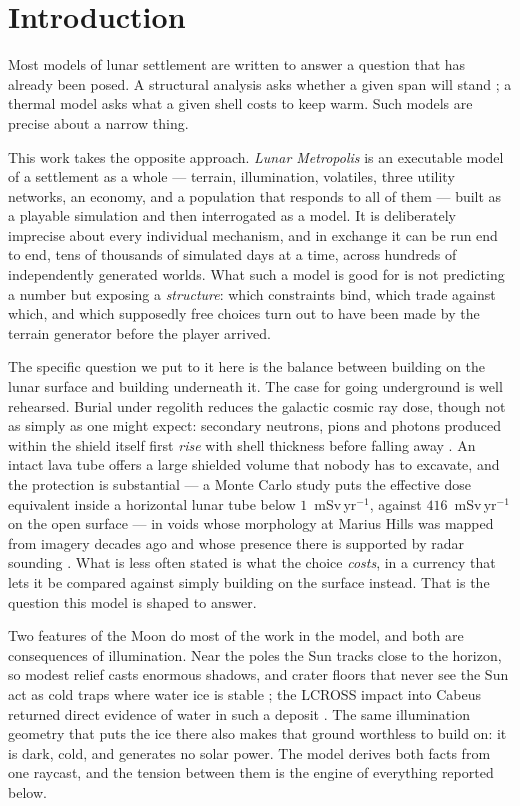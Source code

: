 \section{Introduction}

Most models of lunar settlement are written to answer a question that has
already been posed. A structural analysis asks whether a given span will
stand \citep{blair2017stability}; a thermal model asks what a given shell
costs to keep warm. Such models are precise about a narrow thing.

This work takes the opposite approach. \emph{Lunar Metropolis} is an
executable model of a settlement as a whole --- terrain, illumination,
volatiles, three utility networks, an economy, and a population that responds
to all of them --- built as a playable simulation and then interrogated as a
model. It is deliberately imprecise about every individual mechanism, and in
exchange it can be run end to end, tens of thousands of simulated days at a
time, across hundreds of independently generated worlds. What such a model is
good for is not predicting a number but exposing a \emph{structure}: which
constraints bind, which trade against which, and which supposedly free choices
turn out to have been made by the terrain generator before the player arrived.

The specific question we put to it here is the balance between building on the
lunar surface and building underneath it. The case for going underground is
well rehearsed. Burial under regolith reduces the galactic cosmic ray dose,
though not as simply as one might expect: secondary neutrons, pions and photons
produced within the shield itself first \emph{rise} with shell thickness before
falling away \citep{jia2010radiation}. An intact lava tube offers a large
shielded volume that nobody has to excavate, and the protection is substantial
--- a Monte Carlo study puts the effective dose equivalent inside a horizontal
lunar tube below $1$~mSv\,yr$^{-1}$, against $416$~mSv\,yr$^{-1}$ on the open
surface \citep{naito2020radiation} --- in voids whose morphology at Marius Hills
was mapped from imagery decades ago \citep{greeley1971mariushills} and whose
presence there is supported by radar sounding \citep{kaku2017intact}. What is less often stated is
what the choice \emph{costs}, in a currency that lets it be compared against
simply building on the surface instead. That is the question this model is
shaped to answer.

Two features of the Moon do most of the work in the model, and both are
consequences of illumination. Near the poles the Sun tracks close to the
horizon, so modest relief casts enormous shadows, and crater floors that never
see the Sun act as cold traps where water ice is stable
\citep{paige2010diviner}; the LCROSS impact into Cabeus returned direct
evidence of water in such a deposit \citep{colaprete2010water}. The same
illumination geometry that puts the ice there also makes that ground worthless
to build on: it is dark, cold, and generates no solar power. The model derives
both facts from one raycast, and the tension between them is the engine of
everything reported below.

